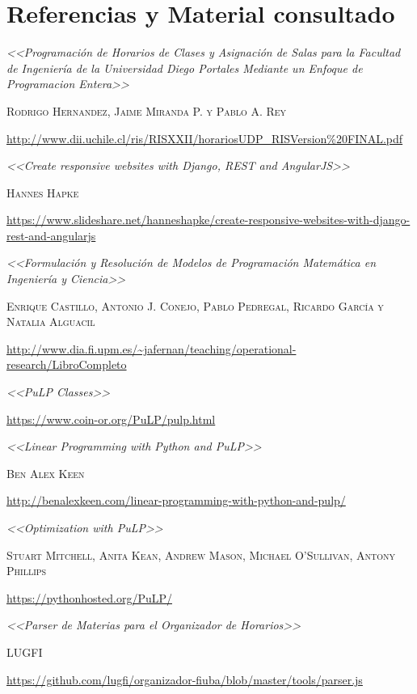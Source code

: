 \documentclass[a4paper]{article}
\begin{document}
\newpage
\section{Referencias y Material consultado}

\renewcommand\refname{\small}

\begin{thebibliography}{X}

 \textit{<<Programación de Horarios de Clases y Asignación de Salas para la Facultad de Ingeniería de la Universidad Diego Portales Mediante un Enfoque de Programacion Entera>>}

\textsc{Rodrigo Hernandez, Jaime Miranda P. y Pablo A. Rey}

\url{http://www.dii.uchile.cl/ris/RISXXII/horariosUDP_RISVersion%20FINAL.pdf}


 \textit{<<Create responsive websites with Django, REST and AngularJS>>}

\textsc{Hannes Hapke}

\url{https://www.slideshare.net/hanneshapke/create-responsive-websites-with-django-rest-and-angularjs}


 \textit{<<Formulación y Resolución de Modelos de Programación Matemática en Ingeniería y Ciencia>>}

\textsc{Enrique Castillo, Antonio J. Conejo, Pablo Pedregal, Ricardo García y Natalia Alguacil}

\url{http://www.dia.fi.upm.es/~jafernan/teaching/operational-research/LibroCompleto}


 \textit{<<PuLP Classes>>}

\url{https://www.coin-or.org/PuLP/pulp.html}


 \textit{<<Linear Programming with Python and PuLP>>}

\textsc{Ben Alex Keen}

\url{http://benalexkeen.com/linear-programming-with-python-and-pulp/}


 \textit{<<Optimization with PuLP>>}

\textsc{Stuart Mitchell, Anita Kean, Andrew Mason, Michael O’Sullivan, Antony Phillips}

\url{https://pythonhosted.org/PuLP/}


 \textit{<<Parser de Materias para el Organizador de Horarios>>}

\textsc{LUGFI}

\url{https://github.com/lugfi/organizador-fiuba/blob/master/tools/parser.js}

\end{thebibliography}
\end{document}

